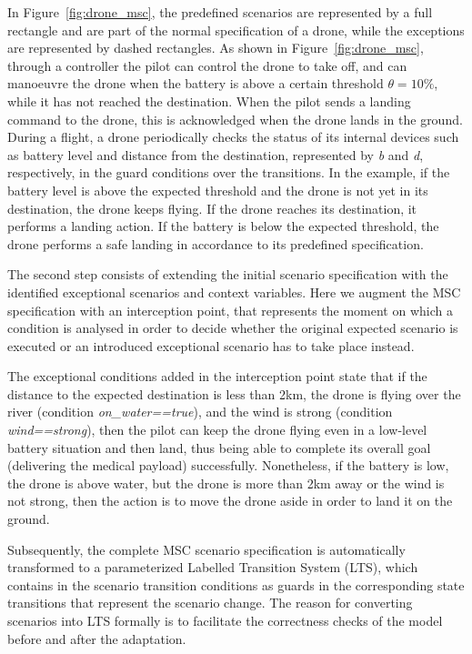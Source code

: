 In Figure~\ref{fig:drone_msc}, the predefined scenarios are represented by a full rectangle and are part of the normal specification of a drone, while the exceptions are represented by dashed rectangles. As shown in Figure~\ref{fig:drone_msc}, through a controller the pilot can control the drone to take off, and can manoeuvre the drone when the battery is above a certain threshold $\theta = 10\%$, while it has not reached the destination. When the pilot sends a landing command to the drone, this is acknowledged when the drone lands in the ground.  During a flight, a drone periodically checks the status of its internal devices such as battery level and distance from the destination, represented by \textit{b} and \textit{d}, respectively, in the guard conditions over the transitions. In the example, if the battery level is above the expected threshold and the drone is not yet in its destination, the drone keeps flying. If the drone reaches its destination, it performs a landing action. If the battery is below the expected threshold, the drone performs a safe landing in accordance to its predefined specification. 

The second step consists of extending the initial scenario specification with the identified exceptional scenarios and context variables. Here we augment the MSC specification with an interception point, that represents the moment on which a condition is analysed in order to decide whether the original expected scenario is executed or an introduced exceptional scenario has to take place instead. 

The exceptional conditions added in the interception point state that if the distance to the expected destination is less than 2km, the drone is flying over the river (condition \textit{on\_water==true}), and the wind is strong (condition \textit{wind==strong}), then the pilot can keep the drone flying even in a low-level battery situation and then land, thus being able to complete its overall goal (delivering the medical payload) successfully. Nonetheless, if the battery is low, the drone is above water, but the drone is more than 2km away or the wind is not strong, then the action is to move the drone aside in order to land it on the ground.


Subsequently, the complete MSC scenario specification is automatically transformed to a parameterized Labelled Transition System (LTS), which contains in the scenario transition conditions as guards in the corresponding state transitions that represent the scenario change. The reason for converting scenarios into LTS formally is to facilitate the correctness checks of the model before and after the adaptation. %

